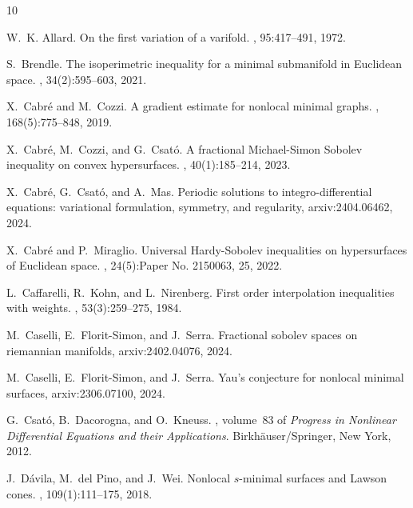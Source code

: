 \documentclass[reqno,12pt]{amsart}
\numberwithin{equation}{section}
\theoremstyle{plain}
\theoremstyle{definition}
\begin{document}
\begin{thebibliography}{10}

W.~K. Allard.
\newblock On the first variation of a varifold.
, 95:417--491, 1972.

S.~Brendle.
\newblock The isoperimetric inequality for a minimal submanifold in {E}uclidean
  space.
, 34(2):595--603, 2021.

X.~Cabr\'{e} and M.~Cozzi.
\newblock A gradient estimate for nonlocal minimal graphs.
, 168(5):775--848, 2019.

X.~Cabr\'{e}, M.~Cozzi, and G.~Csat\'{o}.
\newblock A fractional {M}ichael-{S}imon {S}obolev inequality on convex
  hypersurfaces.
,
  40(1):185--214, 2023.

X.~Cabr\'e, G.~Csat\'o, and A.~Mas.
\newblock Periodic solutions to integro-differential equations: variational
  formulation, symmetry, and regularity, arxiv:2404.06462, 2024.

X.~Cabr\'{e} and P.~Miraglio.
\newblock Universal {H}ardy-{S}obolev inequalities on hypersurfaces of
  {E}uclidean space.
, 24(5):Paper No. 2150063, 25, 2022.

L.~Caffarelli, R.~Kohn, and L.~Nirenberg.
\newblock First order interpolation inequalities with weights.
, 53(3):259--275, 1984.

M.~Caselli, E.~Florit-Simon, and J.~Serra.
\newblock Fractional sobolev spaces on riemannian manifolds, arxiv:2402.04076,
  2024.

M.~Caselli, E.~Florit-Simon, and J.~Serra.
\newblock Yau's conjecture for nonlocal minimal surfaces, arxiv:2306.07100,
  2024.

G.~Csat\'{o}, B.~Dacorogna, and O.~Kneuss.
, volume~83 of {\em
  Progress in Nonlinear Differential Equations and their Applications}.
\newblock Birkh\"{a}user/Springer, New York, 2012.

J.~D\'{a}vila, M.~del Pino, and J.~Wei.
\newblock Nonlocal {$s$}-minimal surfaces and {L}awson cones.
, 109(1):111--175, 2018.


\end{thebibliography}
\end{document}
